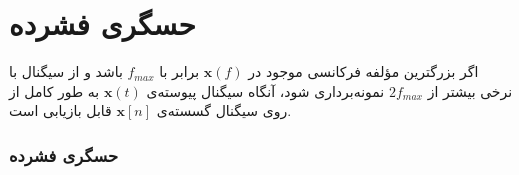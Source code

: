 \begin{frame}
\tableofcontents
\end{frame}


\section{حسگری فشرده\hfill}

\begin{frame}

\begin{theorem}
اگر بزرگترين مؤلفه فرکانسی موجود در
$\bm{x}(f)$
برابر با 
$f_{max}$
باشد  و از سيگنال با نرخی بیشتر از 
$2f_{max}$
نمونه‌برداری شود، آنگاه سیگنال پیوسته‌ی
$\bm{x}(t)$
به طور کامل از روی سیگنال گسسته‌ی
$\bm{x}[n]$
قابل بازیابی است.
\end{theorem}
\pause
\begin{figure}
	\centering
	
\end{figure}
\end{frame}


\begin{frame}
\frametitle{حسگری فشرده}

\begin{columns} 
\begin{figure}
	\centering
	
\end{figure}
\end{columns}
\end{frame}

